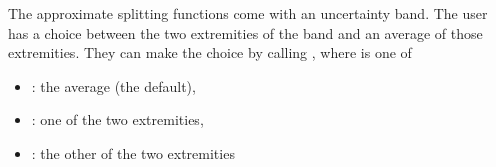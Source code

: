 The approximate splitting functions come with an uncertainty band.
%
The user has a choice between the two extremities of the band and an
average of those extremities.
%
They can make the choice by calling , where
 is one of
\begin{itemize}
\item {}: the average (the default),
\item {}: one of the two extremities,
\item {}: the other of the two extremities
\end{itemize}

% 
% 

